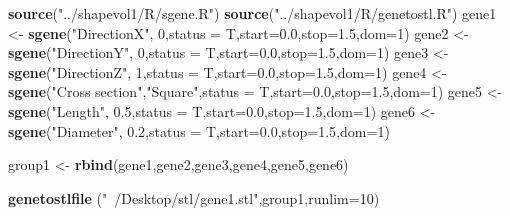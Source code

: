 \documentclass[]{article}
\newenvironment{Shaded}{\begin{snugshade}}{\end{snugshade}}
\newcommand{\DataTypeTok}[1]{\textcolor[rgb]{0.13,0.29,0.53}{#1}}
\newcommand{\DecValTok}[1]{\textcolor[rgb]{0.00,0.00,0.81}{#1}}
\newcommand{\FloatTok}[1]{\textcolor[rgb]{0.00,0.00,0.81}{#1}}
\newcommand{\KeywordTok}[1]{\textcolor[rgb]{0.13,0.29,0.53}{\textbf{#1}}}
\newcommand{\NormalTok}[1]{#1}
\newcommand{\StringTok}[1]{\textcolor[rgb]{0.31,0.60,0.02}{#1}}
\begin{document}
\begin{Shaded}
\begin{Highlighting}[]
\KeywordTok{source}\NormalTok{(}\StringTok{"../shapevol1/R/sgene.R"}\NormalTok{)}
\KeywordTok{source}\NormalTok{(}\StringTok{"../shapevol1/R/genetostl.R"}\NormalTok{)}
\NormalTok{gene1 <-}\StringTok{ }\KeywordTok{sgene}\NormalTok{(}\StringTok{"DirectionX"}\NormalTok{,          }\DecValTok{0}\NormalTok{,}\DataTypeTok{status =}\NormalTok{ T,}\DataTypeTok{start=}\FloatTok{0.0}\NormalTok{,}\DataTypeTok{stop=}\FloatTok{1.5}\NormalTok{,}\DataTypeTok{dom=}\DecValTok{1}\NormalTok{)}
\NormalTok{gene2 <-}\StringTok{ }\KeywordTok{sgene}\NormalTok{(}\StringTok{"DirectionY"}\NormalTok{,          }\DecValTok{0}\NormalTok{,}\DataTypeTok{status =}\NormalTok{ T,}\DataTypeTok{start=}\FloatTok{0.0}\NormalTok{,}\DataTypeTok{stop=}\FloatTok{1.5}\NormalTok{,}\DataTypeTok{dom=}\DecValTok{1}\NormalTok{)}
\NormalTok{gene3 <-}\StringTok{ }\KeywordTok{sgene}\NormalTok{(}\StringTok{"DirectionZ"}\NormalTok{,          }\DecValTok{1}\NormalTok{,}\DataTypeTok{status =}\NormalTok{ T,}\DataTypeTok{start=}\FloatTok{0.0}\NormalTok{,}\DataTypeTok{stop=}\FloatTok{1.5}\NormalTok{,}\DataTypeTok{dom=}\DecValTok{1}\NormalTok{)}
\NormalTok{gene4 <-}\StringTok{ }\KeywordTok{sgene}\NormalTok{(}\StringTok{"Cross section"}\NormalTok{,}\StringTok{"Square"}\NormalTok{,}\DataTypeTok{status =}\NormalTok{ T,}\DataTypeTok{start=}\FloatTok{0.0}\NormalTok{,}\DataTypeTok{stop=}\FloatTok{1.5}\NormalTok{,}\DataTypeTok{dom=}\DecValTok{1}\NormalTok{)}
\NormalTok{gene5 <-}\StringTok{ }\KeywordTok{sgene}\NormalTok{(}\StringTok{"Length"}\NormalTok{,            }\FloatTok{0.5}\NormalTok{,}\DataTypeTok{status =}\NormalTok{ T,}\DataTypeTok{start=}\FloatTok{0.0}\NormalTok{,}\DataTypeTok{stop=}\FloatTok{1.5}\NormalTok{,}\DataTypeTok{dom=}\DecValTok{1}\NormalTok{)}
\NormalTok{gene6 <-}\StringTok{ }\KeywordTok{sgene}\NormalTok{(}\StringTok{"Diameter"}\NormalTok{,          }\FloatTok{0.2}\NormalTok{,}\DataTypeTok{status =}\NormalTok{ T,}\DataTypeTok{start=}\FloatTok{0.0}\NormalTok{,}\DataTypeTok{stop=}\FloatTok{1.5}\NormalTok{,}\DataTypeTok{dom=}\DecValTok{1}\NormalTok{)}

\NormalTok{group1 <-}\StringTok{ }\KeywordTok{rbind}\NormalTok{(gene1,gene2,gene3,gene4,gene5,gene6)}

\KeywordTok{genetostlfile}\NormalTok{   (}\StringTok{"~/Desktop/stl/gene1.stl"}\NormalTok{,group1,}\DataTypeTok{runlim=}\DecValTok{10}\NormalTok{)}
\end{Highlighting}
\end{Shaded}
\end{document}

